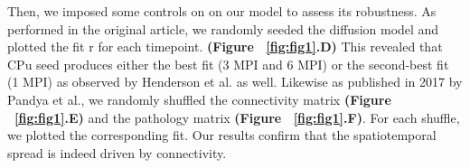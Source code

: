 \begin{table}[ht]
\begin{center}
\begin{tabular}{|l|c|c|}
      
    \end{tabular}
  \end{center}
\end{table}

Then, we imposed some controls on on our model to assess its robustness. As performed in the original article, we randomly seeded the diffusion model and plotted the fit r for each timepoint. \textbf{(Figure ~\ref{fig:fig1}.D)} This revealed that CPu seed produces either the best fit (3 MPI and 6 MPI) or the second-best fit (1 MPI) as observed by Henderson et al. as well. 
Likewise as published in 2017 by Pandya et al., we randomly shuffled the connectivity matrix \textbf{(Figure ~\ref{fig:fig1}.E)} and the pathology matrix \textbf{(Figure ~\ref{fig:fig1}.F)}. For each shuffle, we plotted the corresponding fit. \cite{Pandya_2017} Our results confirm that the spatiotemporal spread is indeed driven by connectivity.


